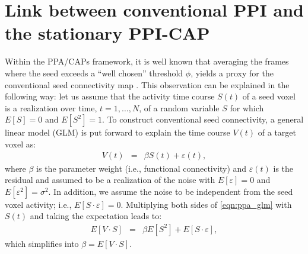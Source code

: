 \renewcommand{\theequation}{Eq. \thechapter.\arabic{equation}}

\section{Link between conventional PPI and the stationary PPI-CAP} 


Within the PPA/CAPs framework, it is well known that averaging the frames where the seed exceeds a ``well chosen'' threshold $\phi$, yields a proxy for the conventional seed connectivity map \citep{Tagliazucchi2012,Liu2013}.
This observation can be explained in the following way:
let us assume that the activity time course $S(t)$ of a seed voxel is a realization over time, $t=1,\ldots,N$, of a random variable $S$ for which $E[S]=0$ and $E[S^2]=1$. 
To construct conventional seed connectivity, a general linear model (GLM) is put forward to explain the time course $V(t)$ of a target voxel as:
\begin{eqnarray}
\label{eqn:ppa_glm}
  V(t) & =& \beta S(t) + \varepsilon(t),
\end{eqnarray}
where $\beta$ is the parameter weight (i.e., functional connectivity) and $\varepsilon(t)$ is the residual and assumed to be a realization of the noise with $E[\varepsilon]=0$ and  $E[\varepsilon^2]=\sigma^2$. In addition, we assume the noise to be independent from the seed voxel activity; i.e., $E[S\cdot \varepsilon]=0$. Multiplying both sides of \ref{eqn:ppa_glm} with $S(t)$ and taking the expectation leads to:
\begin{eqnarray}
   E[ V  \cdot S ]  & = & \beta E[S^2] + E[S \cdot \varepsilon],
\end{eqnarray}
which simplifies into $\beta=E[V\cdot S]$. 

